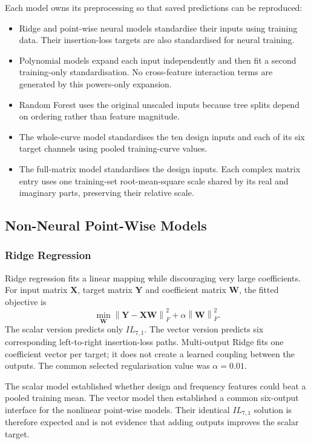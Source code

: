 Each model owns its preprocessing so that saved predictions can be reproduced:

\begin{itemize}
    \item Ridge and point-wise neural models standardise their inputs using
          training data. Their insertion-loss targets are also standardised for
          neural training.
    \item Polynomial models expand each input independently and then fit a
          second training-only standardisation. No cross-feature interaction
          terms are generated by this powers-only expansion.
    \item Random Forest uses the original unscaled inputs because tree splits
          depend on ordering rather than feature magnitude.
    \item The whole-curve model standardises the ten design inputs and each of
          its six target channels using pooled training-curve values.
    \item The full-matrix model standardises the design inputs. Each complex
          matrix entry uses one training-set root-mean-square scale shared by
          its real and imaginary parts, preserving their relative scale.
\end{itemize}

\subsection{Non-Neural Point-Wise Models}
\subsubsection{Ridge Regression}
Ridge regression fits a linear mapping while discouraging very large
coefficients. For input matrix $\mathbf X$, target matrix $\mathbf Y$ and
coefficient matrix $\mathbf W$, the fitted objective is
\begin{equation}
    \min_{\mathbf W}
    \left\|\mathbf Y-\mathbf X\mathbf W\right\|_F^2
    +\alpha\left\|\mathbf W\right\|_F^2.
    \label{eq:appendix-d-ridge}
\end{equation}
The scalar version predicts only $IL_{7,1}$. The vector version predicts six
corresponding left-to-right insertion-loss paths. Multi-output Ridge fits one
coefficient vector per target; it does not create a learned coupling between
the outputs. The common selected regularisation value was $\alpha=0.01$.

The scalar model established whether design and frequency features could beat
a pooled training mean. The vector model then established a common six-output
interface for the nonlinear point-wise models. Their identical $IL_{7,1}$
solution is therefore expected and is not evidence that adding outputs improves
the scalar target.

